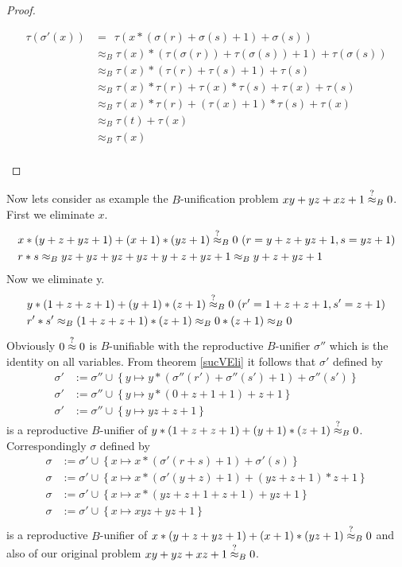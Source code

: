 \begin{proof}
\begin{itemize}
\begin{align*}
		\tau(\sigma'(x))&=\ \ \tau(x*(\sigma(r)+\sigma(s)+1)+\sigma(s))\\
		&\approx_B \tau(x)*(\tau(\sigma(r))+\tau(\sigma(s))+1)+\tau(\sigma(s))\\
		&\approx_B \tau(x)*(\tau(r)+\tau(s)+1)+\tau(s)\\
		&\approx_B \tau(x)*\tau(r)+\tau(x)*\tau(s)+\tau(x)+\tau(s)\\
		&\approx_B \tau(x)*\tau(r)+(\tau(x)+1)*\tau(s)+\tau(x)\\
		&\approx_B \tau(t)+\tau(x)\\
		&\approx_B \tau(x)\\
		\end{align*}
		\end{itemize}
		\end{proof}
		Now lets consider as example the $B$-unification problem $xy+yz+xz+1\stackrel{?}{\approx}_B0$. First we eliminate $x$.
		\begin{align*}
		& x*(y+z+yz+1)+(x+1)*(yz+1)\approxq_B0\ (r=y+z+yz+1,s=yz+1)\\
		& r*s\approx_Byz+yz+yz+yz+y+z+yz+1\approx_By+z+yz+1
		\end{align*}
		Now we eliminate y.
		\begin{align*}
		& y*(1+z+z+1)+(y+1)*(z+1)\stackrel{?}{\approx}_B0\ (r'=1+z+z+1,s'=z+1)\\
		& r'*s'\approx_B(1+z+z+1)*(z+1)\approx_B0*(z+1)\approx_B0
		\end{align*}
		Obviously $0\stackrel{?}{\approx}0$ is $B$-unifiable with the reproductive $B$-unifier $\sigma''$ which is the identity on all variables. From theorem \ref{sucVEli} it follows that $\sigma'$ defined by
		\begin{align*}
		\sigma'&:=\sigma''\cup\left\lbrace y\mapsto y*(\sigma''(r')+\sigma''(s')+1)+\sigma''(s')\right\rbrace\\
		\sigma'&:=\sigma''\cup\left\lbrace y\mapsto y*(0+z+1+1)+z+1\right\rbrace\\
		\sigma'&:=\sigma''\cup\left\lbrace y\mapsto yz+z+1\right\rbrace
		\end{align*}
		is a reproductive $B$-unifier of $y*(1+z+z+1)+(y+1)*(z+1)\stackrel{?}{\approx}_B0$. Correspondingly $\sigma$ defined by
		\begin{align*}
		\sigma&:=\sigma'\cup\left\lbrace x\mapsto x*(\sigma'(r+s)+1)+\sigma'(s)\right\rbrace\\
		\sigma&:=\sigma'\cup\left\lbrace x\mapsto x*(\sigma'(y+z)+1)+(yz+z+1)*z+1\right\rbrace\\
		\sigma&:=\sigma'\cup\left\lbrace x\mapsto x*(yz+z+1+z+1)+yz+1\right\rbrace\\
		\sigma&:=\sigma'\cup\left\lbrace x\mapsto xyz+yz+1\right\rbrace\\
		\end{align*}
		is a reproductive $B$-unifier of $x*(y+z+yz+1)+(x+1)*(yz+1)\stackrel{?}{\approx}_B0$ and also of our original problem $xy+yz+xz+1\stackrel{?}{\approx}_B0$.
